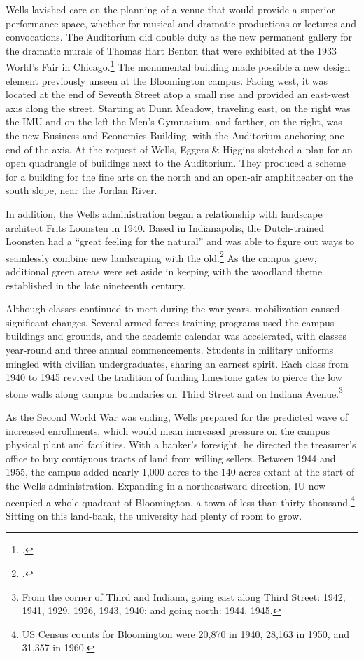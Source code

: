 \documentclass[
  american,
  letterpaper,
]{scrreprt}
\begin{document}
Wells lavished care on the planning of a venue that would provide a
superior performance space, whether for musical and dramatic productions
or lectures and convocations. The Auditorium did double duty as the new
permanent gallery for the dramatic murals of Thomas Hart Benton that
were exhibited at the 1933 World's Fair in Chicago.\footnote{.} The monumental building
made possible a new design element previously unseen at the Bloomington
campus. Facing west, it was located at the end of Seventh Street atop a
small rise and provided an east-west axis along the street. Starting at
Dunn Meadow, traveling east, on the right was the IMU and on the left
the Men's Gymnasium, and farther, on the right, was the new Business and
Economics Building, with the Auditorium anchoring one end of the axis.
At the request of Wells, Eggers \& Higgins sketched a plan for an open
quadrangle of buildings next to the Auditorium. They produced a scheme
for a building for the fine arts on the north and an open-air
amphitheater on the south slope, near the Jordan River.

In addition, the Wells administration began a relationship with
landscape architect Frits Loonsten in 1940. Based in Indianapolis, the
Dutch-trained Loonsten had a ``great feeling for the natural'' and was
able to figure out ways to seamlessly combine new landscaping with the
old.\footnote{.}
As the campus grew, additional green areas were set aside in keeping
with the woodland theme established in the late nineteenth century.

Although classes continued to meet during the war years, mobilization
caused significant changes. Several armed forces training programs used
the campus buildings and grounds, and the academic calendar was
accelerated, with classes year-round and three annual commencements.
Students in military uniforms mingled with civilian undergraduates,
sharing an earnest spirit. Each class from 1940 to 1945 revived the
tradition of funding limestone gates to pierce the low stone walls along
campus boundaries on Third Street and on Indiana Avenue.\footnote{From
  the corner of Third and Indiana, going east along Third Street: 1942,
  1941, 1929, 1926, 1943, 1940; and going north: 1944, 1945.}

As the Second World War was ending, Wells prepared for the predicted
wave of increased enrollments, which would mean increased pressure on
the campus physical plant and facilities. With a banker's foresight, he
directed the treasurer's office to buy contiguous tracts of land from
willing sellers. Between 1944 and 1955, the campus added nearly 1,000
acres to the 140 acres extant at the start of the Wells administration.
Expanding in a northeastward direction, IU now occupied a whole quadrant
of Bloomington, a town of less than thirty thousand.\footnote{US Census
  counts for Bloomington were 20,870 in 1940, 28,163 in 1950, and 31,357
  in 1960.} Sitting on this land-bank, the university had plenty of room
to grow.
\end{document}

